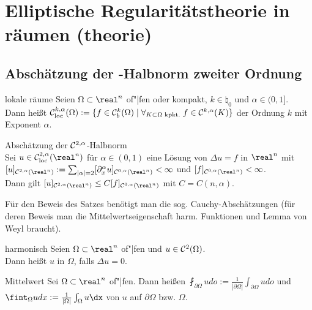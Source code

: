 \chapter{%
    Elliptische Regularitätstheorie in räumen (theorie)%
}

\section{%
    Abschätzung der -Halbnorm zweiter Ordnung%
}

\begin{Def}{lokale räume}
    Seien $\Omega \subset \real^n$ of"|fen oder kompakt, $k \in \natural_0$ und
    $\alpha \in (0, 1]$.\\
    Dann heißt $\mathcal{C}^{k,\alpha}_{\text{loc}}(\Omega) := \{f \in \mathcal{C}^k_b(\Omega) \;|\;
    \forall_{K \subset \Omega \text{ kpkt.}}\; f \in \mathcal{C}^{k,\alpha}(K)\}$
     der Ordnung $k$ mit Exponent $\alpha$.
\end{Def}

\begin{Satz}{Abschätzung der $\mathcal{C}^{2,\alpha}$-Halbnorm}\\
    Sei $u \in \C^{2,\alpha}_\loc(\real^n)$ für $\alpha \in (0, 1)$ eine Lösung von
    $\Delta u = f$ in $\real^n$ mit\\
    $[u]_{\C^{2,\alpha}(\real^n)} :=
    \sum_{|\alpha|=2} [\partial_x^\alpha u]_{\C^{0,\alpha}(\real^n)} < \infty$ und
    $[f]_{\C^{0,\alpha}(\real^n)} < \infty$.\\
    Dann gilt $[u]_{\C^{2,\alpha}(\real^n)} \le C [f]_{\C^{0,\alpha}(\real^n)}$
    mit $C = C(n, \alpha)$.
\end{Satz}

\linie

\begin{Bem}
    Für den Beweis des Satzes benötigt man die sog. Cauchy-Abschätzungen
    (für deren Beweis man die Mittelwertseigenschaft harm. Funktionen
    und Lemma von Weyl braucht).
\end{Bem}

\begin{Def}{harmonisch}
    Seien $\Omega \subset \real^n$ of"|fen und $u \in \mathcal{C}^2(\Omega)$.\\
    Dann heißt $u$  in $\Omega$, falls $\Delta u = 0$.
\end{Def}

\begin{Def}{Mittelwert}
    Sei $\Omega \subset \real^n$ of"|fen.
    Dann heißen
    $\fint_{\partial\Omega} udo := \frac{1}{|\partial\Omega|} \int_{\partial\Omega} udo$ und
    $\fint_\Omega udx := \frac{1}{|\Omega|} \int_\Omega u\dx$  von $u$ auf
    $\partial\Omega$ bzw. $\Omega$.
\end{Def}

